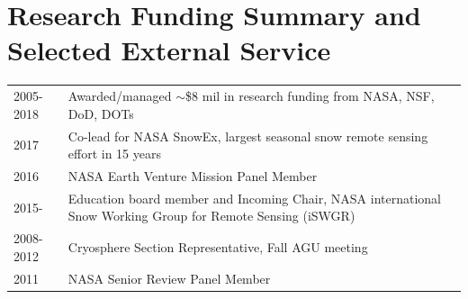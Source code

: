 \documentclass[11pt]{article}
\renewcommand\arraystretch{1}
\begin{document}
\section*{Research Funding Summary and Selected External Service}
\begingroup
\renewcommand\arraystretch{1}
\begin{longtable}{p{0.7in}|p{5.7in}}
2005-2018 & Awarded/managed $\sim$\$8 mil in research funding from NASA, NSF, DoD, DOTs \\ 
2017 & Co-lead for NASA SnowEx, largest seasonal snow remote sensing effort in 15 years \\
2016 & NASA Earth Venture Mission Panel Member \\
2015- & Education board member and Incoming Chair, NASA international Snow Working Group for Remote Sensing (iSWGR) \\
2008-2012 & Cryosphere Section Representative, Fall AGU meeting \\
2011 & NASA Senior Review Panel Member 
\end{longtable}
\endgroup


\end{document}
